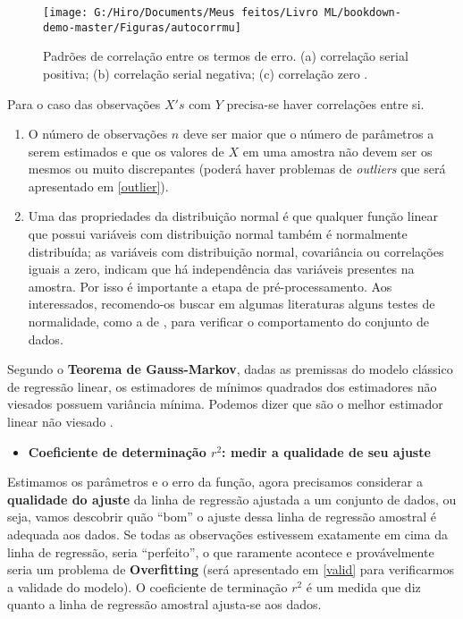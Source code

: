 \documentclass[
  openany]{book}
\providecommand{\tightlist}{%
  \setlength{\itemsep}{0pt}\setlength{\parskip}{0pt}}
\begin{document}
\begin{figure}

{\centering \texttt{[image: G:/Hiro/Documents/Meus feitos/Livro ML/bookdown-demo-master/Figuras/autocorrmu]} 

}

\caption{Padrões de correlação entre os termos de erro. (a) correlação serial positiva; (b) correlação serial negativa; (c) correlação zero \citet{gujarati2011econometria}.}\label{fig:autocorrmu}
\end{figure}



Para o caso das observações \(X's\) com \(Y\) precisa-se haver correlações entre si.

\begin{enumerate}
\def\labelenumi{\arabic{enumi}.}
\setcounter{enumi}{4}
\item
  O número de observações \(n\) deve ser maior que o número de parâmetros a serem estimados e que os valores de \(X\) em uma amostra não devem ser os mesmos ou muito discrepantes (poderá haver problemas de \emph{outliers} que será apresentado em \ref{outlier}).
\item
  Uma das propriedades da distribuição normal é que qualquer função linear que possui variáveis com distribuição normal também é normalmente distribuída; as variáveis com distribuição normal, covariância ou correlações iguais a zero, indicam que há independência das variáveis presentes na amostra. Por isso é importante a etapa de pré-processamento. Aos interessados, recomendo-os buscar em algumas literaturas alguns testes de normalidade, como a de \citep{shapiro1965analysis}, para verificar o comportamento do conjunto de dados.
\end{enumerate}

Segundo o \textbf{Teorema de Gauss-Markov}, dadas as premissas do modelo clássico de regressão linear, os estimadores de mínimos quadrados dos estimadores não viesados possuem variância mínima. Podemos dizer que são o melhor estimador linear não viesado \citep{gujarati2011econometria}.

\begin{itemize}
\tightlist
\item
  \textbf{Coeficiente de determinação \(r^2\): medir a qualidade de seu ajuste}
\end{itemize}

Estimamos os parâmetros e o erro da função, agora precisamos considerar a \textbf{qualidade do ajuste} da linha de regressão ajustada a um conjunto de dados, ou seja, vamos descobrir quão ``bom'' o ajuste dessa linha de regressão
amostral é adequada aos dados. Se todas as observações estivessem exatamente em cima da linha de regressão, seria ``perfeito'', o que raramente acontece e provávelmente seria um problema de \textbf{Overfitting} (será apresentado em \ref{valid} para verificarmos a validade do modelo). O coeficiente de terminação \(r^2\) é um medida que diz quanto a linha de regressão
amostral ajusta-se aos dados.
\end{document}
